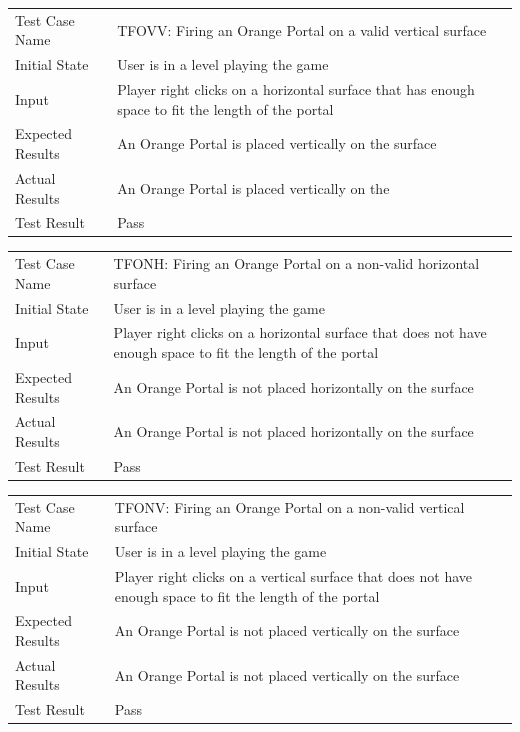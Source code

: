 \documentclass[12pt, titlepage]{article}
\begin{document}
\begin{center}
\begin{tabular}{ | l | p{10cm} | }
\hline
Test Case Name & TFOVV: Firing an Orange Portal on a valid vertical surface	\\
Initial State & User is in a level playing the game	\\
Input & Player right clicks on a horizontal surface that has enough space to fit the length of the portal	\\
Expected Results & An Orange Portal is placed vertically on the surface	\\
Actual Results & An Orange Portal is placed vertically on the 	\\
Test Result & Pass	\\
\hline
\end{tabular}
\end{center}

\begin{center}
\begin{tabular}{ | l | p{10cm} | }
\hline
Test Case Name & TFONH: Firing an Orange Portal on a non-valid horizontal surface	\\
Initial State & User is in a level playing the game	\\
Input & Player right clicks on a horizontal surface that does not have enough space to fit the length of the portal	\\
Expected Results & An Orange Portal is not placed horizontally on the surface	\\
Actual Results & An Orange Portal is not placed horizontally on the surface	\\
Test Result & Pass	\\
\hline
\end{tabular}
\end{center}

\begin{center}
\begin{tabular}{ | l | p{10cm} | }
\hline
Test Case Name & TFONV: Firing an Orange Portal on a non-valid vertical surface	\\
Initial State & User is in a level playing the game	\\
Input & Player right clicks on a vertical surface that does not have enough space to fit the length of the portal	\\
Expected Results & An Orange Portal is not placed vertically on the surface	\\
Actual Results & An Orange Portal is not placed vertically on the surface	\\
Test Result & Pass	\\
\hline
\end{tabular}
\end{center}
\end{document}
